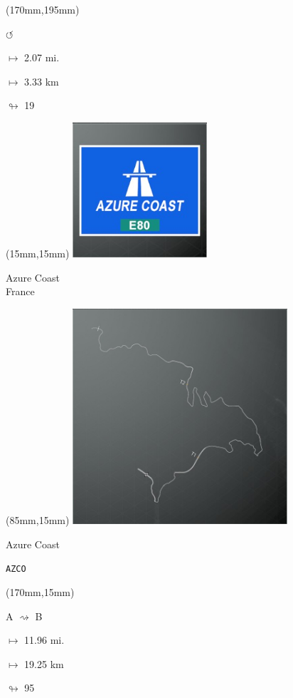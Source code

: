 \begin{textblock*}{30mm}(170mm,195mm)%
\par \Huge$\circlearrowleft$
\Large
\par$\mapsto$ 2.07 mi.
\par$\mapsto$ 3.33 km
\par$\looparrowright$ 19
\end{textblock*}
\null\newpage

\begin{textblock*}{60mm}(15mm,15mm)%
\includegraphics[width=50mm]{LG/2015-05-20_00073.png}
\par Azure Coast\\ France
\end{textblock*}
\begin{textblock*}{80mm}(85mm,15mm)%
\includegraphics[width=80mm]{TR/2015-05-20_00002.png}
\centerline{Azure Coast}
\par\hfill\tiny\tt AZCO\\
\end{textblock*}
\begin{textblock*}{30mm}(170mm,15mm)%
\par A $\rightsquigarrow$ B
\Large
\par$\mapsto$ 11.96 mi.
\par$\mapsto$ 19.25 km
\par$\looparrowright$ 95
\end{textblock*}

